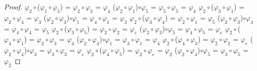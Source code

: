 \documentclass[10pt,a4paper,oneside]{article}
\begin{document}
\begin{proof}
				\newline
				$\varphi_{2}\circ$($\varphi_{1}\circ\varphi_{5}$) = $\varphi_{2}\circ\varphi_{3}$ = $\varphi_{4}$
				\newline
				($\varphi_{2}\circ\varphi_{1}$)$\circ\varphi_{5}$ = $\varphi_{5}\circ\varphi_{5}$ = $\varphi_{4}$
				\newline
				\newline
				$\varphi_{2}\circ$($\varphi_{3}\circ\varphi_{1}$) = $\varphi_{2}\circ\varphi_{4}$ = $\varphi_{3}$
				\newline
				($\varphi_{2}\circ\varphi_{3}$)$\circ\varphi_{1}$ = $\varphi_{4}\circ\varphi_{1}$ = $\varphi_{3}$
				\newline
				\newline
				$\varphi_{2}\circ$($\varphi_{3}\circ\varphi_{4}$) = $\varphi_{2}\circ\varphi_{1}$ = $\varphi_{5}$
				\newline
				($\varphi_{2}\circ\varphi_{3}$)$\circ\varphi_{4}$ = $\varphi_{4}\circ\varphi_{4}$ = $\varphi_{5}$
				\newline
				\newline
				$\varphi_{2}\circ$($\varphi_{3}\circ\varphi_{5}$) = $\varphi_{2}\circ\varphi_{2}$ = $\varphi_{e}$
				\newline
				($\varphi_{2}\circ\varphi_{3}$)$\circ\varphi_{5}$ = $\varphi_{4}\circ\varphi_{5}$ = $\varphi_{e}$
				\newline
				\newline
				$\varphi_{2}\circ$($\varphi_{4}\circ\varphi_{1}$) = $\varphi_{2}\circ\varphi_{3}$ = $\varphi_{4}$
				\newline
				($\varphi_{2}\circ\varphi_{4}$)$\circ\varphi_{1}$ = $\varphi_{3}\circ\varphi_{1}$ = $\varphi_{4}$
				\newline
				\newline
				$\varphi_{2}\circ$($\varphi_{4}\circ\varphi_{3}$) = $\varphi_{2}\circ\varphi_{2}$ = $\varphi_{e}$
				\newline
				($\varphi_{2}\circ\varphi_{4}$)$\circ\varphi_{3}$ = $\varphi_{3}\circ\varphi_{3}$ = $\varphi_{e}$
				\newline
				\newline
				$\varphi_{2}\circ$($\varphi_{4}\circ\varphi_{5}$) = $\varphi_{2}\circ\varphi_{e}$ = $\varphi_{2}$
				\newline
				($\varphi_{2}\circ\varphi_{4}$)$\circ\varphi_{5}$ = $\varphi_{3}\circ\varphi_{5}$ = $\varphi_{2}$
				\newline
				\newline

\end{proof}
\end{document}
